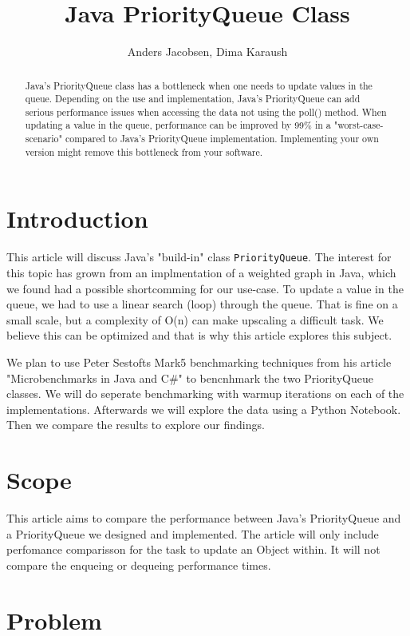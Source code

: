 \documentclass{article}
\title{Java PriorityQueue Class}
\author{Anders Jacobsen, Dima Karaush}
\begin{document}
\maketitle

\begin{abstract}
    Java's PriorityQueue class has a bottleneck when one needs to update values in the queue.
    Depending on the use and implementation, Java's PriorityQueue can add serious performance 
    issues when accessing the data not using the poll() method.
    When updating a value in the queue, performance can be improved by 99\% in a "worst-case-scenario" compared 
    to Java's PriorityQueue implementation. Implementing your own version might remove this 
    bottleneck from your software. 
\end{abstract}

\section{Introduction}
This article will discuss Java's "build-in" class \lstinline!PriorityQueue!. 
The interest for this topic has grown from an implmentation of a weighted graph 
in Java, which we found had a possible shortcomming for our use-case. To update
a value in the queue, we had to use a linear search (loop) through the queue. 
That is fine on a small scale, but a complexity of O(n) can make upscaling a difficult task. 
We believe this can be optimized and that is why this article explores this subject.  

We plan to use Peter Sestofts Mark5 benchmarking techniques from his article 
"Microbenchmarks in Java and C\#" \cite{microbenchmarks} to bencnhmark the two 
PriorityQueue classes. We will do seperate benchmarking with warmup iterations on 
each of the implementations. Afterwards we will explore the data using a Python
Notebook. Then we compare the results to explore our findings. 


\section{Scope}
This article aims to compare the performance between Java's PriorityQueue
and a PriorityQueue we designed and implemented. The article will only include 
perfomance comparisson for the task to update an Object within. It will not 
compare the enqueing or dequeing performance times.

\section{Problem}
\end{document}
